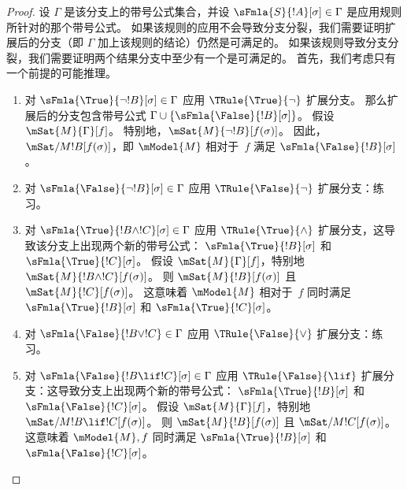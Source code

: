 \documentclass[../../../include/open-logic-section]{subfiles}
\begin{document}
\begin{proof}
设 $\Gamma$ 是该分支上的带号公式集合，并设
$\sFmla{S}{!A}[\sigma] \in \Gamma$ 是应用规则所针对的那个带号公式。
如果该规则的应用不会导致分支分裂，我们需要证明扩展后的分支（即 $\Gamma$ 加上该规则的结论）仍然是可满足的。
如果该规则导致分支分裂，我们需要证明两个结果分支中至少有一个是可满足的。
首先，我们考虑只有一个前提的可能推理。
\begin{enumerate}
\item 对 $\sFmla{\True}{\lnot !B}[\sigma] \in \Gamma$ 应用 $\TRule{\True}{\lnot}$ 扩展分支。
  那么扩展后的分支包含带号公式 $\Gamma \cup
  \{\sFmla{\False}{!B}[\sigma]\}$。
  假设 $\mSat{M}{\Gamma}[f]$。
  特别地，$\mSat{M}{\lnot !B}[f(\sigma)]$。
  因此，$\mSat/{M}{!B}[f(\sigma)]$，即 $\mModel{M}$ 相对于~$f$ 满足
  $\sFmla{\False}{!B}[\sigma]$。
\item 对 $\sFmla{\False}{\lnot !B}[\sigma] \in \Gamma$ 应用 $\TRule{\False}{\lnot}$ 扩展分支：练习。
\item 对 $\sFmla{\True}{!B \land !C}[\sigma] \in \Gamma$ 应用 $\TRule{\True}{\land}$ 扩展分支，这导致该分支上出现两个新的带号公式：
  $\sFmla{\True}{!B}[\sigma]$ 和 $\sFmla{\True}{!C}[\sigma]$。
  假设 $\mSat{M}{\Gamma}[f]$，特别地 $\mSat{M}{!B \land
    !C}[f(\sigma)]$。
  则 $\mSat{M}{!B}[f(\sigma)]$ 且 $\mSat{M}{!C}[f(\sigma)]$。
  这意味着 $\mModel{M}$ 相对于~$f$ 同时满足
  $\sFmla{\True}{!B}[\sigma]$ 和 $\sFmla{\True}{!C}[\sigma]$。
\item 对 $\sFmla{\False}{!B \lor !C} \in \Gamma$ 应用 $\TRule{\False}{\lor}$ 扩展分支：练习。
\item 对 $\sFmla{\False}{!B \lif !C}[\sigma] \in \Gamma$ 应用 $\TRule{\False}{\lif}$ 扩展分支：这导致分支上出现两个新的带号公式：
  $\sFmla{\True}{!B}[\sigma]$ 和 $\sFmla{\False}{!C}[\sigma]$。
  假设 $\mSat{M}{\Gamma}[f]$，特别地
  $\mSat/{M}{!B \lif !C}[f(\sigma)]$。
  则 $\mSat{M}{!B}[f(\sigma)]$ 且 $\mSat/{M}{!C}[f(\sigma)]$。
  这意味着 $\mModel{M}, f$ 同时满足
  $\sFmla{\True}{!B}[\sigma]$ 和 $\sFmla{\False}{!C}[\sigma]$。

\end{enumerate}
\end{proof}
\end{document}
